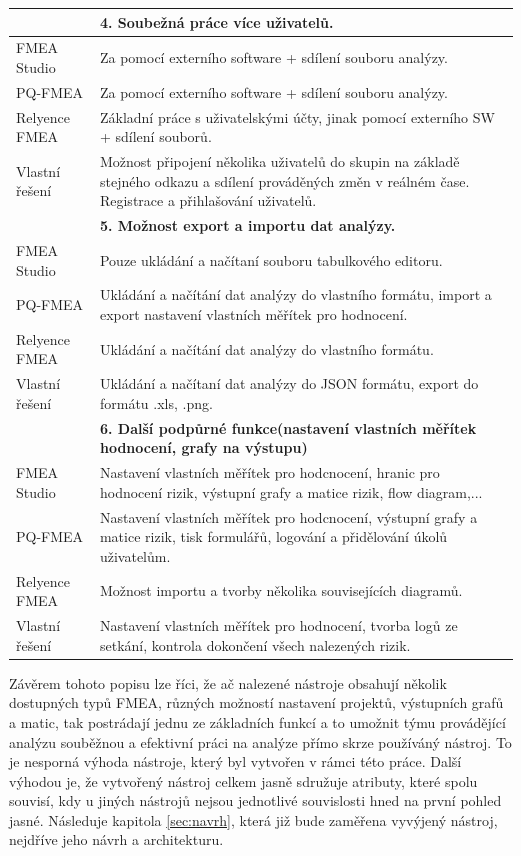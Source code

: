\begin{longtable}{|p{4cm} | p{12cm} |}
& \textbf{4. Soubežná práce více uživatelů.} \\ \hline
 FMEA Studio &	Za pomocí externího software + sdílení souboru analýzy.  \\ 
 PQ-FMEA &	 Za pomocí externího software + sdílení souboru analýzy. \\ 
 Relyence FMEA &	  Základní práce s uživatelskými účty, jinak pomocí externího SW + sdílení souborů.  \\ 
Vlastní řešení &	 Možnost připojení několika uživatelů do skupin na základě stejného odkazu a sdílení prováděných změn v reálném čase. Registrace a přihlašování uživatelů. \\ \hline
& \textbf{5. Možnost export a importu dat analýzy. } \\ \hline
 FMEA Studio &	Pouze ukládání a načítaní souboru tabulkového editoru.  \\ 
 PQ-FMEA &	  Ukládání a načítání dat analýzy do vlastního formátu, import a export nastavení vlastních měřítek pro hodnocení.   \\ 
 Relyence FMEA &	 Ukládání a načítání dat analýzy do vlastního formátu.  \\ 
Vlastní řešení &	 Ukládání a načítaní dat analýzy do JSON formátu, export do formátu .xls, .png.\\ \hline

& \textbf{6. Další podpůrné funkce(nastavení vlastních měřítek hodnocení, grafy na výstupu)} \\ \hline
 FMEA Studio &	Nastavení vlastních měřítek pro hodcnocení, hranic pro hodnocení rizik, výstupní grafy a matice rizik, flow diagram,...  \\ 
 PQ-FMEA &	 Nastavení vlastních měřítek pro hodcnocení, výstupní grafy a matice rizik, tisk formulářů, logování a přidělování úkolů uživatelům.  \\ 
 Relyence FMEA &	  Možnost importu a tvorby několika souvisejících diagramů. \\ 
Vlastní řešení &	  Nastavení vlastních měřítek pro hodnocení, tvorba logů ze setkání, kontrola dokončení všech nalezených rizik. \\ \hline
\end{longtable}

Závěrem tohoto popisu lze říci, že ač nalezené nástroje obsahují několik dostupných typů FMEA, různých možností nastavení projektů, výstupních grafů a matic, tak postrádají jednu ze základních funkcí a to umožnit týmu provádějící analýzu souběžnou a efektivní práci na analýze přímo skrze používáný nástroj. To je nesporná výhoda nástroje, který byl vytvořen v rámci této práce. Další výhodou je, že vytvořený nástroj celkem jasně sdružuje atributy, které spolu souvisí, kdy u jiných nástrojů nejsou jednotlivé souvislosti hned na první pohled jasné. Následuje kapitola \ref{sec:navrh}, která již bude zaměřena vyvýjený nástroj, nejdříve jeho návrh a architekturu. 
 